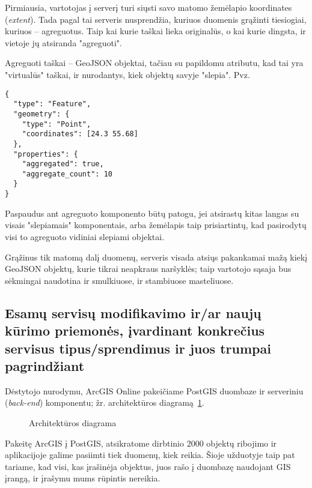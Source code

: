 \documentclass{article}
\begin{document}
Pirmiausia, vartotojas į serverį turi siųsti savo matomo žemėlapio koordinates
({\em extent}). Tada pagal tai serveris nusprendžia, kuriuos duomenis grąžinti
tiesiogiai, kuriuos -- agreguotus. Taip kai kurie taškai lieka originalūs, o
kai kurie dingsta, ir vietoje jų atsiranda "agreguoti".

Agreguoti taškai -- GeoJSON objektai, tačiau su papildomu atributu, kad tai yra
"virtualūs" taškai, ir nurodantys, kiek objektų savyje "slepia". Pvz.

\begin{verbatim}
{
  "type": "Feature",
  "geometry": {
    "type": "Point",
    "coordinates": [24.3 55.68]
  },
  "properties": {
    "aggregated": true,
    "aggregate_count": 10
  }
}
\end{verbatim}

Paspaudus ant agreguoto komponento būtų patogu, jei atsirastų kitas langas su
visais "slepiamais" komponentais, arba žemėlapis taip prisiartintų, kad
pasirodytų visi to agreguoto vidiniai slepiami objektai.

Grąžinus tik matomą dalį duomenų, serveris visada atsiųs pakankamai mažą kiekį
GeoJSON objektų, kurie tikrai neapkraus naršyklės; taip vartotojo sąsaja bus
sėkmingai naudotina ir smulkiuose, ir stambiuose masteliuose.

\subsection{Esamų servisų modifikavimo ir/ar naujų kūrimo priemonės, įvardinant
konkrečius servisus tipus/sprendimus ir juos trumpai pagrindžiant}

Dėstytojo nurodymu, ArcGIS Online pakeičiame PostGIS duombaze ir serveriniu
({\em back-end}) komponentu; žr. architektūros diagramą~\ref{fig:arch}.

\begin{figure}[H]
    \centering
    \caption{Architektūros diagrama}
    \label{fig:arch}
\end{figure}

Pakeitę ArcGIS į PostGIS, atsikratome dirbtinio 2000 objektų ribojimo ir
aplikacijoje galime pasiimti tiek duomenų, kiek reikia. Šioje užduotyje taip
pat tariame, kad visi, kas įrašinėja objektus, juos rašo į duombazę naudojant
GIS įrangą, ir įrašymu mums rūpintis nereikia.
\end{document}
